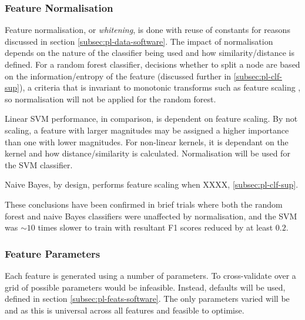         \subsubsection{Feature Normalisation}
        \label{subsubsec:exp-clf-known-featnorm}
            Feature normalisation, or \textit{whitening}, is done with reuse of constants for reasons discussed in section \ref{subsec:pl-data-software}. The impact of normalisation depends on the nature of the classifier being used and how similarity/distance is defined. For a random forest classifier, decisions whether to split a node are based on the information/entropy of the feature (discussed further in \ref{subsec:pl-clf-sup}), a criteria that is invariant to monotonic transforms such as feature scaling \cite{Hastie2009}, so normalisation will not be applied for the random forest.
            
            Linear SVM performance, in comparison, is dependent on feature scaling. By not scaling, a feature with larger magnitudes may be assigned a higher importance than one with lower magnitudes. For non-linear kernels, it is dependant on the kernel and how distance/similarity is calculated. Normalisation will be used for the SVM classifier.
            
            Naive Bayes, by design, performs feature scaling when XXXX, \ref{subsec:pl-clf-sup}. 
            
            These conclusions have been confirmed in brief trials where both the random forest and naive Bayes classifiers were unaffected by normalisation, and the SVM was $\sim10$ times slower to train with resultant F1 scores reduced by at least $0.2$.
    
            
        \subsubsection{Feature Parameters}
        \label{subsubsec:exp-clf-known-featparam}
            Each feature is generated using a number of parameters. To cross-validate over a grid of possible parameters would be infeasible. Instead, defaults will be used, defined in section \ref{subsec:pl-feats-software}. The only parameters varied will be  and  as this is universal across all features and feasible to optimise.
        

